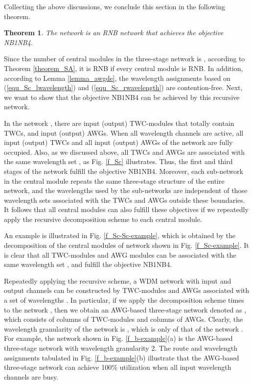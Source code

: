 \documentclass[journal]{IEEEtran}
\newtheorem{theorem}{\textbf{Theorem}}
\begin{document}
Collecting the above discussions, we conclude this section in the
following theorem.
\begin{theorem}\label{theorem_Sc}
The network  is an RNB network that
achieves the objective NB1NB4.
\end{theorem}
\begin{IEEEproof}
Since the number of central modules in the three-stage network
 is , according to Theorem
\ref{theorem_SA}, it is RNB if every central module is RNB. In
addition, according to Lemma \ref{lemma_awgde}, the wavelength
assignments based on (\ref{equ_Sc_lwavelength}) and
(\ref{equ_Sc_rwavelength}) are contention-free. Next, we want to
show that the objective NB1NB4 can be achieved by this
recursive network.

In the network , there are 
 input (output) TWC-modules that totally contain 
TWCs, and   input (output) AWGs. When all
 wavelength channels are active, all input (output) TWCs and
all input (output) AWGs of the network 
are fully occupied. Also, as we discussed above, all TWCs and AWGs
are associated with the same wavelength set , as Fig.
\ref{f_Sc} illustrates. Thus, the first and third stages of the
network  fulfill the objective
NB1NB4. Moreover, each sub-network in the central module
repeats the same three-stage structure of the entire network, and
the wavelengths used by the sub-networks are independent of those
wavelength sets associated with the TWCs and AWGs outside these
boundaries. It follows that all  central modules can also fulfill
these objectives if we repeatedly apply the recursive decomposition
scheme  to each central module.
\end{IEEEproof}

\begin{figure*}[t]
\centering {}
\caption{A fully loaded AWG-based three-stage network: (a)
 and (b) the route and wavelength
assignment.
}\label{f_b-example}
\end{figure*}

An example is illustrated in Fig. \ref{f_Sc-Sc-example}, which is
obtained by the decomposition of the central modules of
 network shown in Fig. \ref{f_Sc-example}. It
is clear that all TWC-modules and AWG modules can be associated with
the same wavelength set , and fulfill the objective
NB1NB4.

Repeatedly applying the recursive scheme, a WDM network with 
input and output channels can be constructed by 
TWC-modules and  AWGs associated with a set of 
wavelengths . In
particular, if we apply the decomposition scheme  times to the
network , then we obtain an AWG-based
three-stage network denoted as , which consists of
 columns of  TWC-modules and  columns of
 AWGs. Clearly, the wavelength granularity of the network
 is , which is only  of that of the
network . For example, the network shown
in Fig. \ref{f_b-example}(a) is the AWG-based three-stage network
 with wavelength granularity 2. The route and
wavelength assignments tabulated in Fig. \ref{f_b-example}(b)
illustrate that the AWG-based three-stage network can achieve 100\%
utilization when all input wavelength channels are busy.
\end{document}
